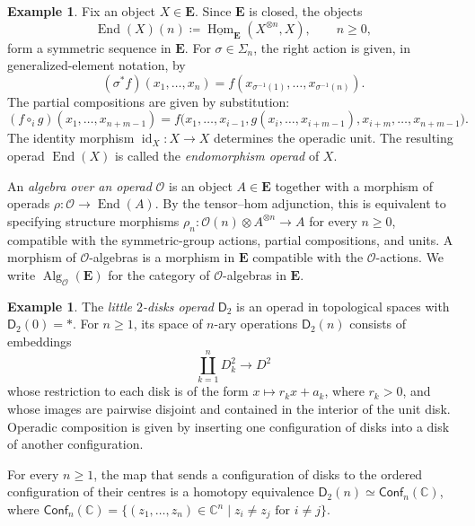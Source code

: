 \documentclass{amsart}
\newcommand{\bE}{\mathbf{E}}
\newcommand{\calO}{\mathcal{O}}
\newcommand{\id}{\operatorname{id}}
\newcommand{\End}{\operatorname{End}}
\newcommand{\Hom}{\operatorname{Hom}}
\newcommand{\Alg}{\operatorname{Alg}}
\newcommand{\Conf}{\mathsf{Conf}}%
\theoremstyle{definition}
\newtheorem{example}[theorem]{Example}%
\numberwithin{equation}{section}
\begin{document}
\begin{example}
\label{ex: endomorphism operad}
Fix an object $X\in\bE$. Since $\bE$ is closed, the objects
\[
\End(X)(n)\coloneqq
\underline{\Hom}_{\bE}(X^{\otimes n},X),
\qquad n\geq 0,
\] form a symmetric sequence in $\bE$. For $\sigma\in\Sigma_n$, the right action is given, in generalized-element notation, by
\begin{equation}
\label{eq:endomorphism-operad-action}
(\sigma^*f)(x_1,\ldots,x_n)
=
f(x_{\sigma^{-1}(1)},\ldots,x_{\sigma^{-1}(n)}).
\end{equation}
The partial compositions are given by substitution:\[(f\circ_i g)(x_1,\ldots,x_{n+m-1}) =f\bigl(x_1,\ldots,x_{i-1},g(x_i,\ldots,x_{i+m-1}),x_{i+m},\ldots,x_{n+m-1}\bigr).\] The identity morphism $\id_X\colon X\to X$ determines the operadic unit. The resulting operad $\End(X)$ is called the \emph{endomorphism operad} of $X$.
\end{example}

An \emph{algebra over an operad} $\calO$ is an object $A\in\bE$ together with a morphism of operads $\rho\colon\calO\to\End(A)$. By the tensor--hom adjunction, this is equivalent to specifying structure morphisms $\rho_n\colon\calO(n)\otimes A^{\otimes n}\to A$ for every $n\geq0$, compatible with the symmetric-group actions, partial compositions, and units. A morphism of $\calO$-algebras is a morphism in $\bE$ compatible with the $\calO$-actions. We write $\Alg_{\calO}(\bE)$ for the category of $\calO$-algebras in $\bE$.

\begin{example}
\label{example: D_2}
The \emph{little $2$-disks operad} $\mathsf{D}_2$ is an operad in
topological spaces with $\mathsf D_2(0)=*$. For $n\geq1$,
its space of $n$-ary operations $\mathsf{D}_2(n)$ consists of embeddings
\[
\coprod_{k=1}^{n}D_k^2\longrightarrow D^2
\]
whose restriction to each disk is of the form $x\mapsto r_kx+a_k$, where $r_k>0$, and whose images are pairwise disjoint and contained in the interior of the unit disk. Operadic composition is given by inserting one configuration of disks into a disk of another configuration.

For every $n\geq1$, the map that sends a configuration of disks to the ordered configuration of their centres is a homotopy equivalence $\mathsf{D}_2(n)\simeq\Conf_n(\mathbb{C})$, where $\Conf_n(\mathbb{C})=\{(z_1,\ldots,z_n)\in\mathbb{C}^n \mid z_i\neq z_j\text{ for }i\neq j\}$.
\end{example}
\end{document}
